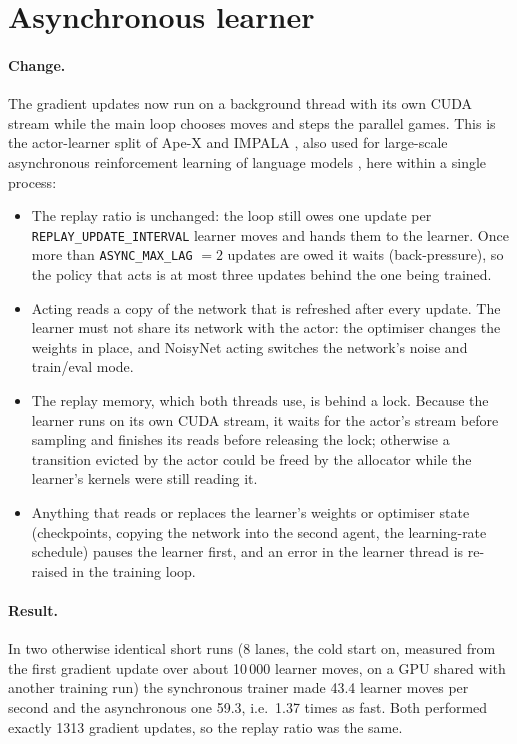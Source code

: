 \section{Asynchronous learner}

\paragraph{Change.} The gradient updates now run on a background thread with its own CUDA
stream while the main loop chooses moves and steps the parallel games. This is the actor-learner
split of Ape-X \cite{ApeX} and IMPALA \cite{IMPALA}, also used for large-scale asynchronous
reinforcement learning of language models \cite{AReaL}, here within a single process:
\begin{itemize}
  \item The replay ratio is unchanged: the loop still owes one update per
        \texttt{REPLAY\_UPDATE\_INTERVAL} learner moves and hands them to the learner. Once more
        than \texttt{ASYNC\_MAX\_LAG} $= 2$ updates are owed it waits (back-pressure), so the
        policy that acts is at most three updates behind the one being trained.
  \item Acting reads a copy of the network that is refreshed after every update. The learner
        must not share its network with the actor: the optimiser changes the weights in place,
        and NoisyNet acting switches the network's noise and train/eval mode.
  \item The replay memory, which both threads use, is behind a lock. Because the learner runs on
        its own CUDA stream, it waits for the actor's stream before sampling and finishes its
        reads before releasing the lock; otherwise a transition evicted by the actor could be
        freed by the allocator while the learner's kernels were still reading it.
  \item Anything that reads or replaces the learner's weights or optimiser state (checkpoints,
        copying the network into the second agent, the learning-rate schedule) pauses the
        learner first, and an error in the learner thread is re-raised in the training loop.
\end{itemize}

\paragraph{Result.} In two otherwise identical short runs (8 lanes, the cold start on, measured
from the first gradient update over about 10\,000 learner moves, on a GPU shared with another
training run) the synchronous trainer made 43.4 learner moves per second and the asynchronous one
59.3, i.e.\ 1.37 times as fast. Both performed exactly 1313 gradient updates, so the replay ratio
was the same.

